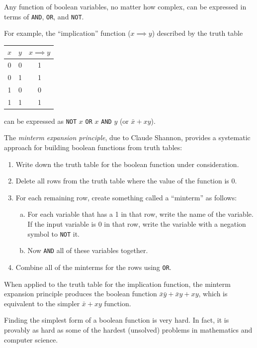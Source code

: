 \documentclass[8pt,a4paper,compress,handout]{beamer}
\begin{document}
\begin{frame}[fragile]
Any function of boolean variables, no matter how complex, can be expressed in terms of \lstinline{AND}, \lstinline{OR}, and \lstinline{NOT}.

\bigskip

For example, the ``implication'' function ($x \implies y$) described by the truth table
\begin{center}
\begin{tabular}{cc|c}
$x$ & $y$ & $x \implies y$ \\ \hline
0 & 0 & 1 \\
0 & 1 & 1 \\
1 & 0 & 0 \\
1 & 1 & 1
\end{tabular}
\end{center}
can be expressed as \lstinline{NOT} $x$ \lstinline{OR} $x$ \lstinline{AND} $y$ (or $\bar{x}+xy$).
\end{frame}

\begin{frame}[fragile]
The \emph{minterm expansion principle}, due to Claude Shannon, provides a systematic approach for building boolean functions from truth tables:
\begin{enumerate}
\item Write down the truth table for the boolean function under consideration.

\item Delete all rows from the truth table where the value of the function is 0.

\item For each remaining row, create something called a ``minterm'' as follows:
\begin{enumerate}[a.]
\item For each variable that has a 1 in that row, write the name of the variable. If the input variable is 0 in that row, write the variable with a negation symbol to \lstinline{NOT} it.

\item Now \lstinline{AND} all of these variables together.
\end{enumerate}

\item Combine all of the minterms for the rows using \lstinline{OR}.
\end{enumerate}

\bigskip

When applied to the truth table for the implication function, the minterm expansion principle produces the boolean function $\bar{x}\bar{y}+\bar{x}y+xy$, which is equivalent to the simpler $\bar{x}+xy$ function.

\bigskip

Finding the simplest form of a boolean function is very hard. In fact, it is provably as hard as some of the hardest (unsolved) problems in mathematics and computer science.
\end{frame}
\end{document}
